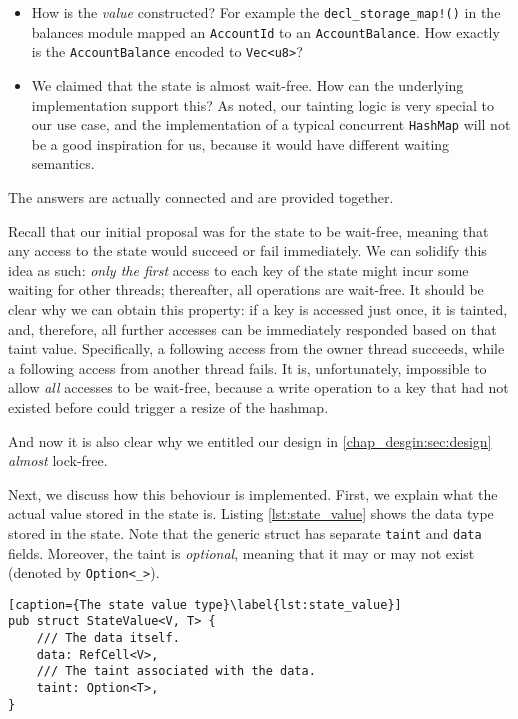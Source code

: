 \begin{itemize}
	\item How is the \textit{value} constructed? For example the \texttt{decl\_storage\_map!()} in
	the balances module mapped an \texttt{AccountId} to an \texttt{AccountBalance}. How exactly is
	the \texttt{AccountBalance} encoded to \texttt{Vec<u8>}?
	\item We claimed that the state is almost wait-free. How can the underlying implementation
	support this? As noted, our tainting logic is very special to our use case, and the
	implementation of a typical concurrent \texttt{HashMap} will not be a good inspiration for us,
	because it would have different waiting semantics.
\end{itemize}

The answers are actually connected and are provided together.

Recall that our initial proposal was for the state to be wait-free, meaning that any access to the state
would succeed or fail immediately. We can solidify this idea as such: \textit{only the first} access
to each key of the state might incur some waiting for other threads; thereafter, all operations
are wait-free. It should be clear why we can obtain this property: if a key is accessed just
once, it is tainted, and, therefore, all further accesses can be immediately responded based on that
taint value. Specifically, a following access from the owner thread succeeds, while a following access from 
another thread fails. It is, unfortunately,
impossible to allow \textit{all} accesses to be wait-free, because a write operation to a key that
had not existed before could trigger a resize of the hashmap.

\begin{remark}
	And now it is also clear why we entitled our design in \ref{chap_desgin:sec:design} \textit{almost}
	lock-free.
\end{remark}

Next, we discuss how this behoviour is implemented. First, we explain what the actual value stored in the
state is. Listing \ref{lst:state_value} shows the data type stored in the state. Note that the generic struct has
separate \texttt{taint} and \texttt{data} fields. Moreover, the taint is \textit{optional}, meaning
that it may or may not exist (denoted by \texttt{Option<\_>}). 

\begin{lstlisting}[caption={The state value type}\label{lst:state_value}]
pub struct StateValue<V, T> {
	/// The data itself.
	data: RefCell<V>,
	/// The taint associated with the data.
	taint: Option<T>,
}
\end{lstlisting}


